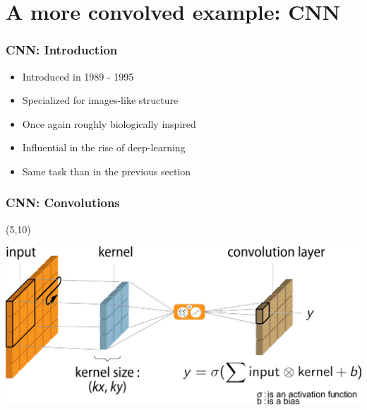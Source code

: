 \section{A more convolved example: \acl{CNN}}

\begin{frame}
  \frametitle{\acl{CNN}: Introduction}

  \begin{itemize}
  \item Introduced in 1989 - 1995
  \item Specialized for images-like structure
  \item Once again roughly biologically inspired
  \item Influential in the rise of deep-learning
  \item Same task than in the previous section
  \end{itemize}
\end{frame}


\begin{frame}
  \frametitle{\acl{CNN}: Convolutions}

  \begin{textblock}{90}(5,10)
    \begin{center}
      \includegraphics[width=\textwidth]{img/Convolution.png}
    \end{center}
  \end{textblock}
\end{frame}


